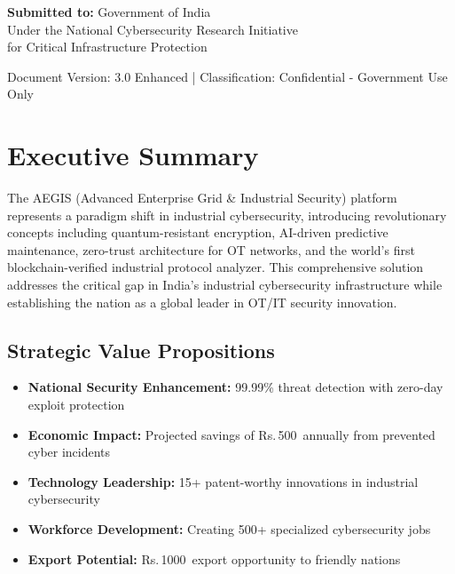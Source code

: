 \documentclass[12pt,a4paper]{article}
\newcommand{\rupees}{Rs.\,}
\newcommand{\crores}{\text{ Crores}}
\begin{document}
\begin{titlepage}
    \vfill
    
    {\large\textbf{Submitted to:} Government of India\\[0.2cm]}
    {\normalsize Under the National Cybersecurity Research Initiative\\[0.2cm]}
    {\normalsize for Critical Infrastructure Protection}
    
    \vspace{1cm}
    
    {\footnotesize Document Version: 3.0 Enhanced | Classification: Confidential - Government Use Only}
    
\end{titlepage}

\newpage

\tableofcontents
\newpage

\listoffigures
\newpage

\listoftables
\newpage

\printglossary[type=\acronymtype,title=List of Acronyms]
\newpage

\section{Executive Summary}

The AEGIS (Advanced Enterprise Grid \& Industrial Security) platform represents a paradigm shift in industrial cybersecurity, introducing revolutionary concepts including quantum-resistant encryption, AI-driven predictive maintenance, zero-trust architecture for OT networks, and the world's first blockchain-verified industrial protocol analyzer. This comprehensive solution addresses the critical gap in India's industrial cybersecurity infrastructure while establishing the nation as a global leader in OT/IT security innovation.

\subsection{Strategic Value Propositions}
\begin{itemize}[leftmargin=*]
    \item \textbf{National Security Enhancement:} 99.99\% threat detection with zero-day exploit protection
    \item \textbf{Economic Impact:} Projected savings of \rupees 500\crores\ annually from prevented cyber incidents
    \item \textbf{Technology Leadership:} 15+ patent-worthy innovations in industrial cybersecurity
    \item \textbf{Workforce Development:} Creating 500+ specialized cybersecurity jobs
    \item \textbf{Export Potential:} \rupees 1000\crores\ export opportunity to friendly nations
\end{itemize}
\end{document}
